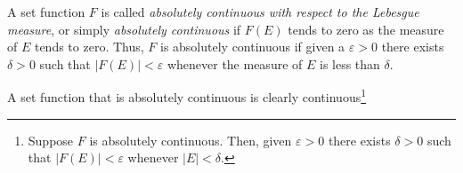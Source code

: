 A set function $F$ is called \emph{absolutely continuous with respect to
  the Lebesgue measure}, or simply \emph{absolutely continuous} if $F(E)$
tends to zero as the measure of $E$ tends to zero. Thus, $F$ is absolutely
continuous if given a $\varepsilon>0$ there exists $\delta>0$ such that
$|F(E)|<\varepsilon$ whenever the measure of $E$ is less than $\delta$.

A set function that is absolutely continuous is clearly
continuous\footnote{Suppose $F$ is absolutely continuous. Then, given
  $\varepsilon>0$ there exists $\delta>0$ such that $|F(E)|<\varepsilon$
  whenever $|E|<\delta$.}


